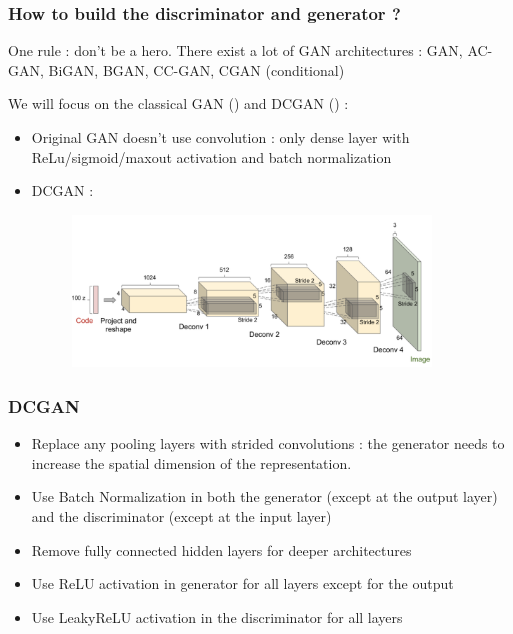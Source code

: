 \documentclass[french,9pt]{beamer}
\begin{document}
\begin{frame}
\frametitle{How to build the discriminator and generator ? }
One rule : don't be a hero. There exist a lot of GAN architectures : GAN, AC-GAN, BiGAN, BGAN, CC-GAN, CGAN (conditional)

 We will focus on the classical GAN (\cite{googfellow2014}) and DCGAN (\cite{2015arXiv151106434R}) :
 
 \begin{itemize}
 \item Original GAN doesn't use convolution : only dense layer with ReLu/sigmoid/maxout activation and batch normalization
 \item DCGAN :
 \begin{figure}
  \begin{center}
    \includegraphics[width=0.9\textwidth]{fig/dcgan_generator.png}
  \end{center}
\end{figure}
 \end{itemize}
 

\end{frame}

\begin{frame}
\frametitle{DCGAN}

\begin{itemize}
\item Replace any pooling layers with strided convolutions : the generator needs to increase the spatial dimension of the representation.
\item Use Batch Normalization in both the generator (except at the output layer) and the discriminator (except at the input layer)
\item Remove fully connected hidden layers for deeper architectures
\item Use ReLU activation in generator for all layers except for the output
\item Use LeakyReLU activation in the discriminator for all layers
\end{itemize}

\end{frame}
\end{document}
